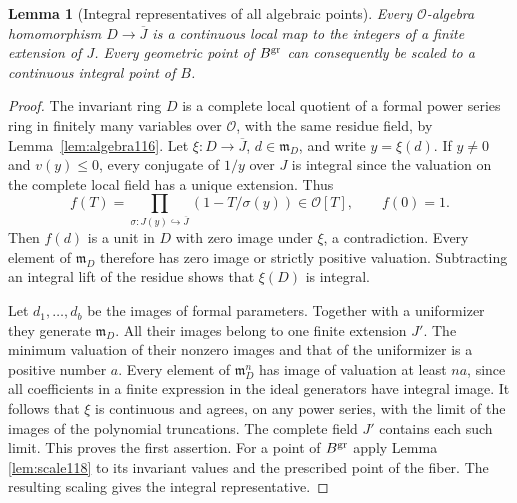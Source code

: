 \documentclass[a4paper,11pt]{article}
\newtheorem{lemma}[proposition]{Lemma}
\theoremstyle{definition}
\theoremstyle{remark}
\numberwithin{equation}{section}
\newcommand{\OO}{\mathcal O}
\begin{document}
\begin{lemma}[Integral representatives of all algebraic points]
\label{lem:integral121}
Every \(\OO\)-algebra homomorphism \(D\to\overline J\) is a
continuous local map to the integers of a finite extension of
\(J\). Every geometric point of \(B^{\rm gr}\) can consequently
be scaled to a continuous integral point of \(B\).
\end{lemma}
\begin{proof}
The invariant ring \(D\) is a complete local quotient of a formal
power series ring in finitely many variables over \(\OO\), with
the same residue field, by Lemma~\ref{lem:algebra116}. Let
\(\xi:D\to\overline J\), \(d\in\mathfrak m_D\), and write
\(y=\xi(d)\). If \(y\ne0\) and \(v(y)\le0\), every conjugate
of \(1/y\) over \(J\) is integral since the valuation on the
complete local field has a unique extension. Thus
\[
       f(T)=\prod_{\sigma:J(y)\hookrightarrow\overline J}
                          (1-T/\sigma(y))\in\OO[T],
       \qquad f(0)=1.
\]
Then \(f(d)\) is a unit in \(D\) with zero image under \(\xi\),
a contradiction. Every element of \(\mathfrak m_D\) therefore
has zero image or strictly positive valuation. Subtracting an
integral lift of the residue shows that \(\xi(D)\) is integral.

Let \(d_1,\ldots,d_b\) be the images of formal parameters.
Together with a uniformizer they generate \(\mathfrak m_D\).
All their images belong to one finite extension \(J'\).
The minimum valuation of their nonzero images and that of the
uniformizer is a positive number \(a\). Every element of
\(\mathfrak m_D^n\) has image of valuation at least \(na\),
since all coefficients in a finite expression in the ideal
generators have integral image. It follows that \(\xi\) is
continuous and agrees, on any power series, with the limit
of the images of the polynomial truncations. The complete
field \(J'\) contains each such limit. This proves the first
assertion. For a point of \(B^{\rm gr}\) apply
Lemma \ref{lem:scale118}
to its invariant values and the prescribed point of the fiber.
The resulting scaling gives the integral representative.
\end{proof}
\end{document}
